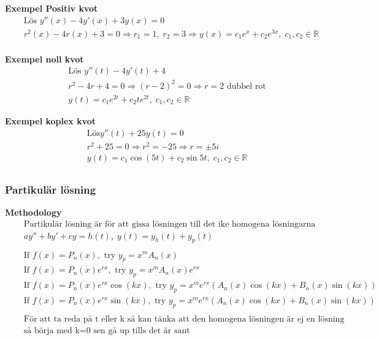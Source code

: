 \documentclass{article}
\begin{document}
\textbf{Exempel Positiv kvot}
\begin{align*}
  &\quad  \text{Lös } y''(x)-4y'(x)+3y(x)=0 \\
  &\quad  r^2(x)-4r(x)+3=0 \Rightarrow r_1=1, \; r_2=3 \Rightarrow y(x) = c_1e^x + c_2e^{3x}, \;
  c_1,c_2 \in\mathbb{R} \\
\end{align*}

\textbf{Exempel noll kvot}
\begin{align*}
  &\quad  \text{Lös } y''(t)-4y'(t)+4 \\
  &\quad  r^2-4r+4=0 \Rightarrow {(r-2)}^2=0 \Rightarrow r=2 \text{ dubbel rot} \\
  &\quad  y(t) = c_1e^{2t} + c_2te^{2t}, \; c_1,c_2 \in\mathbb{R}
\end{align*}

\textbf{Exempel koplex kvot}
\begin{align*}
  &\quad  \text{Lös} y''(t) + 25y(t) = 0 \\
  &\quad  r^2 + 25 = 0 \Rightarrow r^2 = -25 \Rightarrow r=\pm5i \\
  &\quad  y(t) = c_1\cos(5t)+c_2\sin{5t}, \; c_1,c_2 \in\mathbb{R} \\
\end{align*}



\subsubsection{Partikulär lösning}
\textbf{Methodology}  %
\begin{align*}
  &\quad  \text{Partikulär lösning är för att gissa lösningen till det ike homogena lösningarna} \\
  &\quad  ay''+by'+cy=h(t), \; y(t) = y_h(t) + y_p(t) \\
  &\quad  \\
  &\quad  \text{If } f(x)=P_n(x), \text{ try } y_p=x^m A_n(x) \\
  &\quad  \text{If } f(x)=P_n(x)e^{rx}, \text{ try } y_p=x^m A_n(x)e^{rx} \\
  &\quad  \text{If } f(x)=P_n(x)e^{rx}\cos(kx), \text{ try } y_p=x^m e^{rx}(A_n(x)\cos(kx)+B_n(x)\sin(kx)) \\
  &\quad  \text{If } f(x)=P_n(x)e^{rx}\sin(kx), \text{ try } y_p=x^m e^{rx}(A_n(x)\cos(kx)+B_n(x)\sin(kx)) \\ 
  &\quad  \\
  &\quad  \text{För att ta reda på t eller k så kan tänka att den homogena lösningen är ej en lösning } \\
  &\quad  \text{så börja med k=0 sen gå up tills det är sant} \\
\end{align*}
\end{document}
